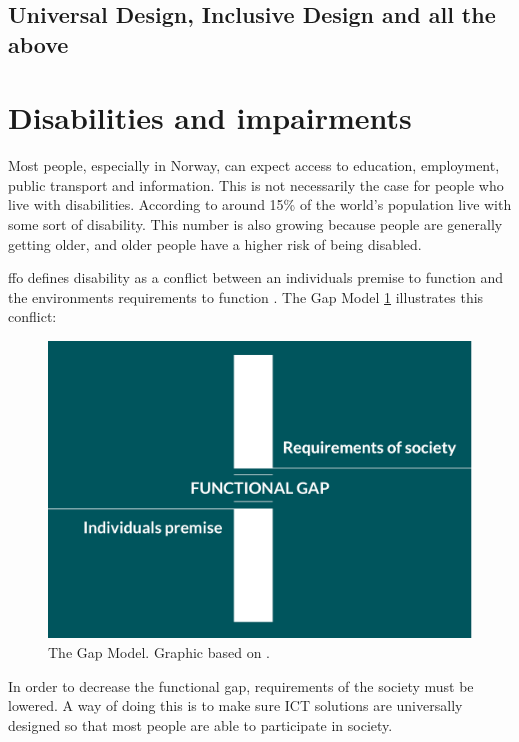 \subsection{Universal Design, Inclusive Design and all the above}

\iffalse
    \section{Disabilities and impairments}
    Most people, especially in Norway, can expect access to education, employment, public transport and information. This is not necessarily the case for people who live with disabilities. According to \textcite{world_health_organization_world_2011} around 15\% of the world's population live with some sort of disability. This number is also growing because people are generally getting older, and older people have a higher risk of being disabled. 
    
    \acrfull{ffo} defines disability as a conflict between an individuals premise to function and the environments requirements to function \parencite{funksjonshemmedes_fellesorganisasjon_ffo_definisjon_2013}. The Gap Model \ref{fig:gap_model} illustrates this conflict: 
    \begin{figure}[H]
      \includegraphics[width=\linewidth]{img/gapmodel.png}
      \caption{The Gap Model. Graphic based on \textcite{difi_kvifor_2016}.}\label{fig:gap_model}
    \endminipage\hfill
    \end{figure}
    
    In order to decrease the functional gap, requirements of the society must be lowered. A way of doing this is to make sure ICT solutions are universally designed so that most people are able to participate in society. 

